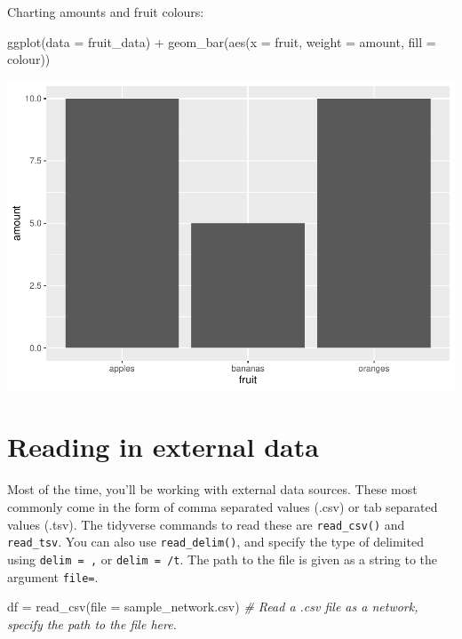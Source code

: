 \documentclass[
]{book}
\newenvironment{Shaded}{\begin{snugshade}}{\end{snugshade}}
\newcommand{\AttributeTok}[1]{\textcolor[rgb]{0.77,0.63,0.00}{#1}}
\newcommand{\CommentTok}[1]{\textcolor[rgb]{0.56,0.35,0.01}{\textit{#1}}}
\newcommand{\FunctionTok}[1]{\textcolor[rgb]{0.00,0.00,0.00}{#1}}
\newcommand{\NormalTok}[1]{#1}
\newcommand{\OtherTok}[1]{\textcolor[rgb]{0.56,0.35,0.01}{#1}}
\newcommand{\SpecialCharTok}[1]{\textcolor[rgb]{0.00,0.00,0.00}{#1}}
\newcommand{\StringTok}[1]{\textcolor[rgb]{0.31,0.60,0.02}{#1}}
\begin{document}
Charting amounts and fruit colours:

\begin{Shaded}
\begin{Highlighting}[]
\FunctionTok{ggplot}\NormalTok{(}\AttributeTok{data =}\NormalTok{ fruit\_data) }\SpecialCharTok{+} \FunctionTok{geom\_bar}\NormalTok{(}\FunctionTok{aes}\NormalTok{(}\AttributeTok{x =}\NormalTok{ fruit, }\AttributeTok{weight =}\NormalTok{ amount, }\AttributeTok{fill =}\NormalTok{ colour)) }
\end{Highlighting}
\end{Shaded}

\includegraphics{_main_files/figure-latex/unnamed-chunk-26-1.pdf}

\hypertarget{reading-in-external-data}{%
\section{Reading in external data}\label{reading-in-external-data}}

Most of the time, you'll be working with external data sources. These most commonly come in the form of comma separated values (.csv) or tab separated values (.tsv). The tidyverse commands to read these are \texttt{read\_csv()} and \texttt{read\_tsv}. You can also use \texttt{read\_delim()}, and specify the type of delimited using \texttt{delim\ =\ \textquotesingle{},\textquotesingle{}} or \texttt{delim\ =\ \textquotesingle{}/t}. The path to the file is given as a string to the argument \texttt{file=}.

\begin{Shaded}
\begin{Highlighting}[]
\NormalTok{df }\OtherTok{=} \FunctionTok{read\_csv}\NormalTok{(}\AttributeTok{file =} \StringTok{\textquotesingle{}sample\_network.csv\textquotesingle{}}\NormalTok{) }\CommentTok{\# Read a .csv file as a network, specify the path to the file here.}
\end{Highlighting}
\end{Shaded}
\end{document}
